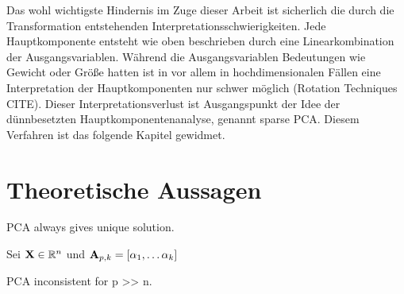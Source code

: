 Das wohl wichtigste Hindernis im Zuge dieser Arbeit ist sicherlich die durch die Transformation entstehenden Interpretationsschwierigkeiten. Jede Hauptkomponente entsteht wie oben beschrieben durch eine Linearkombination der Ausgangsvariablen. Während die Ausgangsvariablen Bedeutungen wie Gewicht oder Größe hatten ist in vor allem in hochdimensionalen Fällen eine Interpretation der Hauptkomponenten nur schwer möglich (Rotation Techniques CITE). Dieser Interpretationsverlust ist Ausgangspunkt der Idee der dünnbesetzten Hauptkomponentenanalyse, genannt sparse PCA. Diesem Verfahren ist das folgende Kapitel gewidmet.


\section{Theoretische Aussagen}

\begin{thm}
PCA always gives unique solution.
\end{thm}

\begin{thm}
Sei $\mathbf{X} \in \mathbb{R}^n$ und $\mathbf{A}_{p,k} = [\alpha_1, \ldots \alpha_k] $   
\end{thm}

\begin{thm}
PCA inconsistent for p >> n.
\end{thm}

